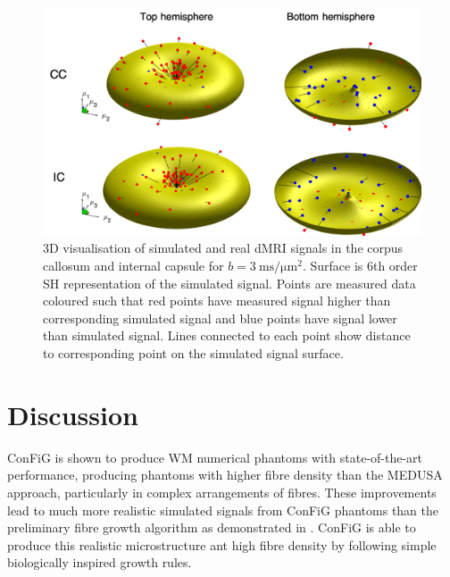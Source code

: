 \begin{figure}
  \centering
  \includegraphics[width=\textwidth]{figures/config/plot3d_whitebg}
  \caption[3D visualisation of simulated and real \ac{dMRI} signals]{3D visualisation of simulated and real \acs{dMRI} signals in the corpus callosum and internal capsule for $b=\SI{3}{\milli\second\per\micro\metre\squared}$. Surface is 6th order \ac{SH} representation of the simulated signal. Points are measured data coloured such that red points have measured signal higher than corresponding simulated signal and blue points have signal lower than simulated signal. Lines connected to each point show distance to corresponding point on the simulated signal surface. }
  \label{fig:config_3d_vis}
\end{figure}

\section{Discussion}
\label{sec:config_discussion}
ConFiG is shown to produce \ac{WM} numerical phantoms with state-of-the-art performance, producing phantoms with higher fibre density than the MEDUSA approach, particularly in complex arrangements of fibres. These improvements lead to much more realistic simulated signals from \ac{ConFiG} phantoms than the preliminary fibre growth algorithm as demonstrated in . \ac{ConFiG} is able to produce this realistic microstructure ant high fibre density by following simple biologically inspired growth rules.


